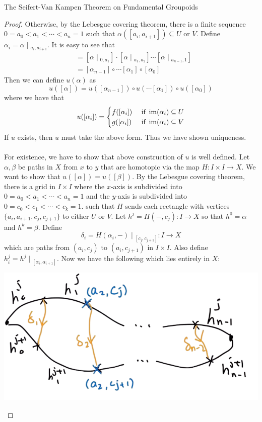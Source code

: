 \documentclass[a4paper]{article}
\begin{document}
\begin{thm}{The Seifert-Van Kampen Theorem on Fundamental Groupoids}{}
\begin{proof}
Otherwise, by the Lebesgue covering theorem, there is a finite sequence $0=a_0<a_1<\cdots<a_n=1$ such that $\alpha([a_i,a_{i+1}])\subseteq U$ or $V$. Define $\alpha_i=\alpha\;|\;_{a_i,a_{i+1}}$. It is easy to see that 
\begin{align*}
[\alpha]&=[\alpha\;|\;_{0,a_1}]\cdot[\alpha\;|\;_{a_1,a_2}]\cdots[\alpha\;|\;_{a_{n-1},1}]\tag{Viewed as paths}\\
&=[\alpha_{n-1}]\circ\cdots[\alpha_1]\circ[\alpha_0]\tag{Viewed as morphisms in $\Pi_1X$}
\end{align*} Then we can define $u(\alpha)$ as $$u([\alpha])=u([\alpha_{n-1}])\circ u(\cdots[\alpha_1])\circ u([\alpha_0])$$ where we have that $$u([\alpha_i])=\begin{cases}
f([\alpha_i]) & \text{ if }\operatorname{im}(\alpha_i)\subseteq U\\
g([\alpha_i]) & \text{ if }\operatorname{im}(\alpha_i)\subseteq V
\end{cases}$$ If $u$ exists, then $u$ must take the above form. Thus we have shown uniqueness. \\~\\

For existence, we have to show that above construction of $u$ is well defined. Let $\alpha,\beta$ be paths in $X$ from $x$ to $y$ that are homotopic via the map $H:I\times I\to X$. We want to show that $u([\alpha])=u([\beta])$. By the Lebesgue covering theorem, there is a grid in $I\times I$ where the $x$-axis is subdivided into $0=a_0<a_1<\cdots<a_n=1$ and the $y$-axis is subdivided into $0=c_0<c_1<\cdots<c_k=1$.  such that $H$ sends each rectangle with vertices $\{a_i,a_{i+1},c_j,c_{j+1}\}$ to either $U$ or $V$. Let $h^j=H(-,c_j):I\to X$ so that $h^0=\alpha$ and $h^k=\beta$. Define $$\delta_i=H(\alpha_i,-)\;|\;_{[c_j,c_{j+1}]}:I\to X$$ which are paths from $(a_i,c_j)$ to $(a_i,c_{j+1})$ in $I\times I$. Also define $h_i^j=h^j\;|\;_{[\alpha_i,\alpha_{i+1}]}$. Now we have the following which lies entirely in $X$: 

\begin{center}
\includegraphics[scale = 0.3]{Image 1}
\end{center}


\end{proof}
\end{thm}
\end{document}
